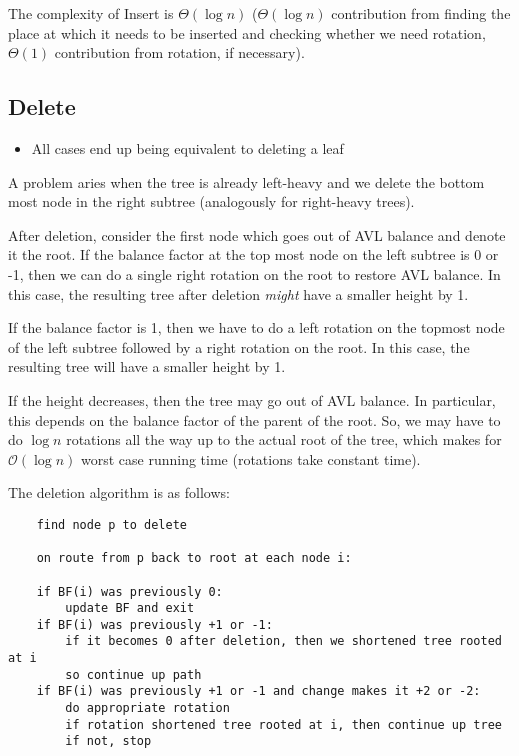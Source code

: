 \documentclass[11pt]{article}
\begin{document}
The complexity of Insert is $\Theta(\log n)$ ($\Theta(\log n)$ contribution from finding the place at which it needs to be inserted and checking whether we need rotation, $\Theta(1)$ contribution from rotation, if necessary).

\subsection{Delete}
\begin{itemize}
    \item All cases end up being equivalent to deleting a leaf
\end{itemize}
A problem aries when the tree is already left-heavy and we delete the bottom most node in the right subtree (analogously for right-heavy trees). 

After deletion, consider the first node which goes out of AVL balance and denote it the root. If the balance factor at the top most node on the left subtree is 0 or -1, then we can do a single right rotation on the root to restore AVL balance. In this case, the resulting tree after deletion \emph{might} have a smaller height by 1. 

If the balance factor is 1, then we have to do a left rotation on the topmost node of the left subtree followed by a right rotation on the root. In this case, the resulting tree will have a smaller height by 1.

If the height decreases, then the tree may go out of AVL balance. In particular, this depends on the balance factor of the parent of the root. So, we may have to do $\log n$ rotations all the way up to the actual root of the tree, which makes for $\mathcal{O}(\log n)$ worst case running time (rotations take constant time). 

The deletion algorithm is as follows:

\begin{verbatim}
    find node p to delete 
    
    on route from p back to root at each node i: 
    
    if BF(i) was previously 0: 
        update BF and exit 
    if BF(i) was previously +1 or -1: 
        if it becomes 0 after deletion, then we shortened tree rooted at i
        so continue up path 
    if BF(i) was previously +1 or -1 and change makes it +2 or -2: 
        do appropriate rotation
        if rotation shortened tree rooted at i, then continue up tree
        if not, stop 
\end{verbatim}
\end{document}
